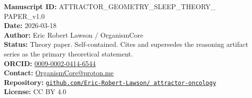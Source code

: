 \documentclass[10pt, a4paper]{article}
\begin{document}
{\footnotesize
\textbf{Manuscript ID:}
ATTRACTOR\_GEOMETRY\_SLEEP\_THEORY\_
PAPER\_v1.0\\
\textbf{Date:} 2026-03-18\\
\textbf{Author:} Eric Robert Lawson /
OrganismCore\\
\textbf{Status:} Theory paper.
Self-contained. Cites and supersedes
the reasoning artifact series as
the primary theoretical statement.\\
\textbf{ORCID:}
\href{https://orcid.org/0009-0002-0414-6544}
{0009-0002-0414-6544}\\
\textbf{Contact:}
\href{mailto:OrganismCore@proton.me}
{OrganismCore@proton.me}\\
\textbf{Repository:}
\href{https://github.com/Eric-Robert-Lawson/attractor-oncology}
{\texttt{github.com/Eric-Robert-Lawson/
attractor-oncology}}\\
\textbf{License:} CC BY 4.0
}
\end{document}
